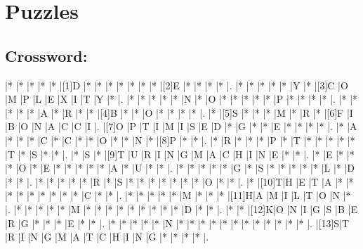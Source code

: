 \documentclass{article}
\begin{document}
\section*{Puzzles}

\subsection*{Crossword:}

\begin{Puzzle}{18}{18} %
|*    |*    |*    |*    |*    |[1]D |*    |*    |*    |*    |*    |*    |*    |[2]E |*    |*    |*    |*    |.
|*    |*    |*    |*    |*    |Y    |*    |[3]C |O    |M    |P    |L    |E    |X    |I    |T    |Y    |*    |.
|*    |*    |*    |*    |*    |N    |*    |O    |*    |*    |*    |*    |*    |P    |*    |*    |*    |*    |.
|*    |*    |*    |*    |*    |A    |*    |R    |*    |*    |[4]B |*    |*    |O    |*    |*    |*    |*    |.
|*    |[5]S |*    |*    |*    |M    |*    |R    |*    |[6]F |I    |B    |O    |N    |A    |C    |C    |I    |.
|[7]O |P    |T    |I    |M    |I    |S    |E    |D    |*    |G    |*    |*    |E    |*    |*    |*    |*    |.
|*    |A    |*    |*    |*    |C    |*    |C    |*    |*    |O    |*    |*    |N    |*    |[8]P |*    |*    |.
|*    |R    |*    |*    |*    |P    |*    |T    |*    |*    |*    |*    |*    |T    |*    |S    |*    |*    |.
|*    |S    |*    |[9]T |U    |R    |I    |N    |G    |M    |A    |C    |H    |I    |N    |E    |*    |*    |.
|*    |E    |*    |*    |*    |O    |*    |E    |*    |*    |*    |*    |*    |A    |*    |U    |*    |*    |.
|*    |*    |*    |*    |*    |G    |*    |S    |*    |*    |*    |*    |*    |L    |*    |D    |*    |*    |.
|*    |*    |*    |*    |*    |R    |*    |S    |*    |*    |*    |*    |*    |*    |*    |O    |*    |*    |.
|*    |[10]T|H    |E    |T    |A    |*    |*    |*    |*    |*    |*    |*    |*    |*    |C    |*    |*    |.
|*    |*    |*    |*    |*    |M    |*    |*    |*    |[11]H|A    |M    |I    |L    |T    |O    |N    |*    |.
|*    |*    |*    |*    |*    |M    |*    |*    |*    |*    |*    |*    |*    |*    |*    |D    |*    |*    |.
|*    |*    |[12]K|O    |N    |I    |G    |S    |B    |E    |R    |G    |*    |*    |*    |E    |*    |*    |.
|*    |*    |*    |*    |*    |N    |*    |*    |*    |*    |*    |*    |*    |*    |*    |*    |*    |*    |.
|[13]S|T    |R    |I    |N    |G    |M    |A    |T    |C    |H    |I    |N    |G    |*    |*    |*    |*    |.
\end{Puzzle}
\end{document}
